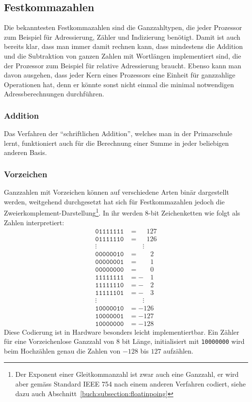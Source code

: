 %
%
\subsection{Festkommazahlen
\label{buch:subsection:integers}}
Die bekanntesten Festkommazahlen sind die Ganzzahltypen, die jeder
Prozessor zum Beispiel für Adressierung, Zähler und Indizierung
benötigt.
Damit ist auch bereits klar, dass man immer damit rechnen kann, dass
mindestens die Addition und die Subtraktion von ganzen Zahlen mit
Wortlängen implementiert sind, die der Prozessor zum Beispiel für
relative Adressierung braucht.
Ebenso kann man davon ausgehen, dass jeder Kern eines Prozessors
eine Einheit für ganzzahlige Operationen hat, denn er könnte sonst
nicht einmal die minimal notwendigen Adressberechnungen durchführen.

\subsubsection{Addition}
Das Verfahren der ``schriftlichen Addition'', welches man in der Primarschule
lernt, funktioniert auch für die Berechnung einer Summe in jeder beliebigen
anderen Basis.

\subsubsection{Vorzeichen}
Ganzzahlen mit Vorzeichen können auf verschiedene Arten binär dargestellt
werden, weitgehend durchgesetzt hat sich für Festkommazahlen jedoch die
Zweierkomplement-Darstellung\footnote{Der Exponent einer Gleitkommanzahl
ist zwar auch eine Ganzzahl, er wird aber gemäss Standard IEEE 754
nach einem anderen Verfahren codiert, siehe dazu auch
Abschnitt~\ref{buch:subsection:floatinpoing}}.
In ihr werden 8-bit Zeichenketten wie folgt als Zahlen interpretiert:
\begin{align*}
\texttt{01111111}&= \phantom{-}127\\
\texttt{01111110}&= \phantom{-}126\\
\vdots\quad&\qquad\vdots\\
\texttt{00000010}&= \phantom{-00}2\\
\texttt{00000001}&= \phantom{-00}1\\
\texttt{00000000}&= \phantom{-00}0\\
\texttt{11111111}&= -\phantom{00}1\\
\texttt{11111110}&= -\phantom{00}2\\
\texttt{11111101}&= -\phantom{00}3\\
\vdots\quad&\qquad\vdots\\
\texttt{10000010}&=-126\\
\texttt{10000001}&=-127\\
\texttt{10000000}&=-128
\end{align*}
Diese Codierung ist in Hardware besonders leicht implementiertbar.
Ein Zähler für eine Vorzeichenlose Ganzzahl von 8 bit Länge, initialisiert
mit \texttt{10000000} wird beim Hochzählen genau die Zahlen von $-128$
bis $127$ aufzählen.

